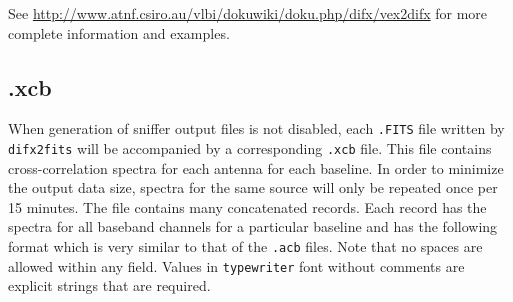 See \url{http://www.atnf.csiro.au/vlbi/dokuwiki/doku.php/difx/vex2difx} for more complete information and examples.









\subsection{.xcb} \label{sec:xcb}

When generation of sniffer output files is not disabled, each {\tt .FITS} file written by {\tt difx2fits} will be accompanied by a corresponding {\tt .xcb} file. 
This file contains cross-correlation spectra for each antenna for each baseline.
In order to minimize the output data size, spectra for the same source will only be repeated once per 15 minutes.
The file contains many concatenated records.
Each record has the spectra for all baseband channels for a particular baseline and has the following format which is very similar to that of the {\tt .acb} files. 
Note that no spaces are allowed within any field.
Values in {\tt typewriter} font without comments are explicit strings that are required.


